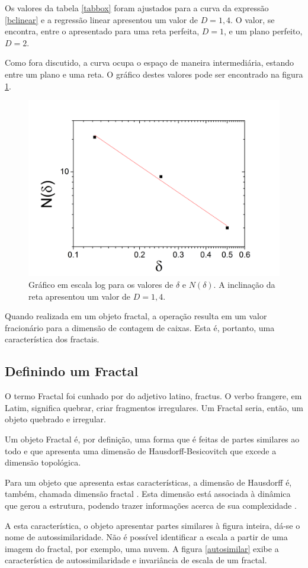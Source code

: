 \documentclass{ufscThesis}
\begin{document}
Os valores da tabela \ref{tabbox} foram ajustados para a curva da expressão \ref{bclinear} e a regressão linear apresentou um valor de $D=1,4$. O valor, se encontra, entre o apresentado para uma reta perfeita, $D=1$, e um plano perfeito, $D=2$. \par
Como fora discutido, a curva ocupa o espaço de maneira intermediária, estando entre um plano e uma reta. O gráfico destes valores pode ser encontrado na figura \ref{regbox}.
\begin{figure}[!h]
\centering
\includegraphics[scale=0.2]{graphboxcount.png}
\caption{Gráfico em escala log para os valores de $\delta$ e $N(\delta)$. A inclinação da reta apresentou um valor de $D=1,4$.}
\label{regbox}
\end{figure}

Quando realizada em um objeto fractal, a operação resulta em um valor fracionário para a dimensão de contagem de caixas. Esta é, portanto, uma característica dos fractais.\par

\subsection{Definindo um Fractal}
O termo Fractal foi cunhado por  do adjetivo latino, fractus. O verbo frangere, em Latim, significa quebrar, criar fragmentos irregulares. Um Fractal seria, então, um objeto quebrado e irregular.\par
Um objeto Fractal é, por definição, uma forma que é feitas de partes similares ao todo e que apresenta uma dimensão de Hausdorff-Besicovitch que excede a dimensão topológica. \cite{feder1988fractals}\par 
Para um objeto que apresenta estas características, a dimensão de Hausdorff é, também, chamada dimensão fractal \cite{mandelbrot1983fractal}. Esta dimensão está associada à dinâmica que gerou a estrutura, podendo trazer informações acerca de sua complexidade \cite{Figueiredo2013}. \par
A esta característica, o objeto apresentar partes similares à figura inteira, dá-se o nome de autossimilaridade. Não é possível identificar a escala a partir de uma imagem do fractal, por exemplo, uma nuvem. A figura \ref{autosimilar} exibe a característica de autossimilaridade e invariância de escala de um fractal.
\end{document}
